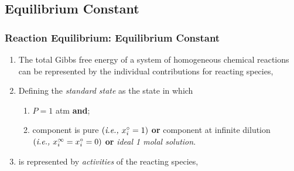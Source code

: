 \documentclass[10pt,compress,unknownkeysallowed]{beamer}
\begin{document}
\subsection{Equilibrium Constant}

\begin{frame}
  \frametitle{Reaction Equilibrium: Equilibrium Constant}
      \begin{enumerate} 
        \item<1-> The total Gibbs free energy of a system of homogeneous chemical reactions can be represented by the individual contributions for reacting species,
        \item<2-> Defining the {\it standard state} \blue{$\left(^{\circ}\right)$} as the state in which
            \begin{enumerate}
               \item<2-> $P=1$ atm {\bf and};
               \item<2-> component is pure $\left(\text{{\it i.e., }} x_{i}^{\circ}=1\right)$ {\bf or } component at infinite dilution $\left(\text{{\it i.e., }} x_{i}^{\infty}=x_{i}^{\circ}=0\right)$ {\bf or} {\it ideal 1 molal solution}.
            \end{enumerate}
         \item<3->  is represented by {\it activities} of the reacting species, \ie

      \end{enumerate}
\end{frame}
\end{document}
